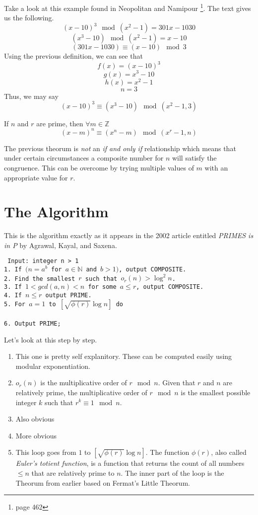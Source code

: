 \documentclass[11pt]{article}
\begin{document}
Take a look at this example found in Neopolitan and Namipour \footnote{page 462}. The text gives us the following.
$$(x-10)^3 \mod (x^2-1) = 301x-1030 $$
$$(x^3-10) \mod (x^2-1) = x-10$$
$$(301x-1030) \equiv (x-10) \mod 3$$
Using the previous definition, we can see that
$$f(x) = (x-10)^3$$
$$g(x) = x^3-10$$
$$h(x) = x^2-1$$
$$n=3$$
Thus, we may say
$$(x-10)^3 \equiv (x^3-10) \mod (x^2-1,3)$$
\begin{thm}{If $n$ and $r$ are prime, then $\forall{m\in{\mathbb{Z}}}$}
\begin{equation}
(x-m)^n \equiv (x^n -m) \mod (x^r-1,n)
\end{equation}
\end{thm}
The previous theorum is \emph{not} an \emph{if and only if} relationship which means that under certain circumstances a composite number for $n$ will satisfy the congruence. This can be overcome by trying multiple values of $m$ with an appropriate value for $r$.

\section{The Algorithm}
This is the algorithm exactly as it appears in the 2002 article entitled \emph{PRIMES is in P} by Agrawal, Kayal, and Saxena. \vspace{2pc}

\texttt{
Input: integer n > 1 \\
1. If $(n=a^b$ for $a\in{\mathbb{N}}$ and  $b>1)$, output COMPOSITE. \\
2. Find the smallest $r$ such that 	$o_r(n)>\log^2n$. \\
3. If $1<gcd(a,n)<n$ for some $a\le{r}$, output COMPOSITE. \\
4. If $n \le{r}$ output PRIME. \\
5. For $a=1$ to $[\sqrt{\phi(r)}\log{n}]$ do \\
 \\
6. Output PRIME; \\
}

Let's look at this step by step.
\begin{enumerate}
  \item This one is pretty self explanitory. These can be computed easily using modular exponentiation.
  \item $o_r(n)$ is the multiplicative order of $r \mod n$. Given that $r$ and $n$ are relatively prime, the multiplicative order of $r \mod n$ is the smallest possible integer $k$ such that $r^k \equiv 1\mod n$.
  \item Also obvious
  \item More obvious
  \item This loop goes from $1$ to $[\sqrt{\phi(r)}\log{n}]$. The function $\phi(r)$, also called \emph{Euler's totient function}, is a function that returns the count of all numbers $\le n$ that are relatively prime to $n$. The inner part of the loop is the Theorum from earlier based on Fermat's Little Theorum. 
\end{enumerate}
\end{document}
